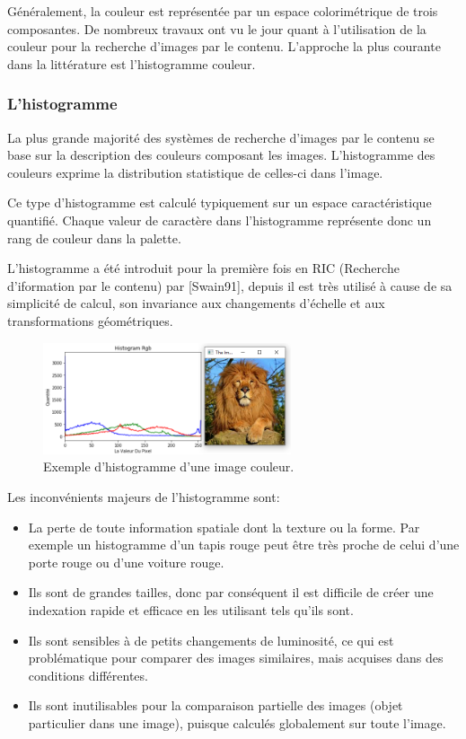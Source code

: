 Généralement, la couleur est représentée par un espace colorimétrique de trois composantes. De nombreux travaux ont vu le jour quant à l’utilisation de la couleur pour la recherche d’images par le contenu. L’approche la plus courante dans la littérature est l’histogramme couleur.

\subsubsection{L'histogramme}
La plus grande majorité des systèmes de recherche d'images par le contenu se base sur la description des couleurs composant les images. L'histogramme des couleurs exprime la distribution statistique de celles-ci dans l'image.

Ce type d'histogramme est calculé typiquement sur un espace caractéristique quantifié. Chaque valeur de caractère dans l'histogramme représente donc un rang de couleur dans la palette. 

L'histogramme a été introduit pour la première fois en RIC (Recherche d'iformation par le contenu) par [Swain91], depuis il est très utilisé à cause de sa simplicité de calcul, son invariance aux changements d'échelle et aux transformations géométriques.\\

\begin{figure}[H]
	\label{fig:hist}
	\centering
	\includegraphics[width=0.65\textwidth]{Figures/hist} %
	\caption{Exemple d’histogramme d’une image couleur.}
\end{figure}

Les inconvénients majeurs de l'histogramme sont:
\begin{itemize}
	\item La perte de toute information spatiale dont la texture ou la forme. Par exemple un histogramme d'un tapis rouge peut être très proche de celui d'une porte rouge ou d'une voiture rouge.
	
	\item Ils sont de grandes tailles, donc par conséquent il est difficile de créer une indexation rapide et efficace en les utilisant tels qu'ils sont. 
	
	\item Ils sont sensibles à de petits changements de luminosité, ce qui est problématique pour comparer des images similaires, mais acquises dans des conditions différentes. 
	
	\item Ils sont inutilisables pour la comparaison partielle des images (objet particulier dans une image), puisque calculés globalement sur toute l’image.
	
\end{itemize}

